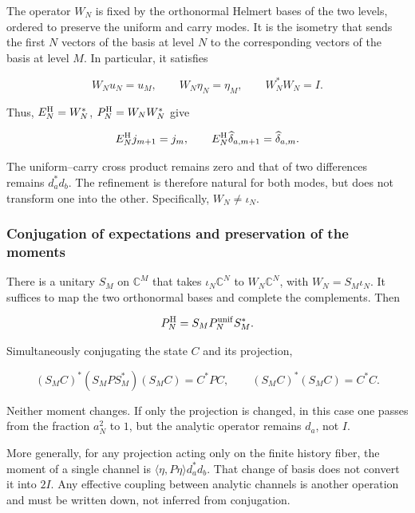 The operator \(W_N\) is fixed by the orthonormal Helmert bases
of the two levels, ordered to preserve the uniform and carry
modes. It is the isometry that sends the first \(N\) vectors of the
basis at level \(N\) to the corresponding vectors of the basis at level \(M\).
In particular, it satisfies

\begin{equation}
W_Nu_N=u_M,\qquad W_N\eta_N=\eta_M,\qquad W_N^*W_N=I.
\label{viii:gamma-add-display-12}
\end{equation}

Thus, \(E_N^{\rm H}=W_N^*\), \(P_N^{\rm H}=W_NW_N^*\) give

\begin{equation}
E_N^{\rm H}j_{m+1}=j_m,\qquad
E_N^{\rm H}\widehat\delta_{a,m+1}=\widehat\delta_{a,m}.
\label{viii:gamma-add-eq-5}
\end{equation}

The uniform--carry cross product remains zero and that of two differences remains \(d_a^*d_b\). The refinement is therefore natural for both modes, but does not transform one into the other. Specifically, \(W_N\ne\iota_N\).

\subsubsection{Conjugation of expectations and preservation of the moments}
\label{viii:gamma-add-sub-174}

There is a unitary \(S_M\) on \(\mathbb C^M\) that takes \(\iota_N\mathbb C^N\) to \(W_N\mathbb C^N\), with \(W_N=S_M\iota_N\). It suffices to map the two orthonormal bases and complete the complements. Then

\begin{equation}
P_N^{\rm H}=S_MP_N^{\rm unif}S_M^*.
\label{viii:gamma-add-display-14}
\end{equation}

Simultaneously conjugating the state \(C\) and its projection,

\begin{equation}
(S_MC)^*(S_MP S_M^*)(S_MC)=C^*PC,\qquad
(S_MC)^*(S_MC)=C^*C.
\label{viii:gamma-add-eq-6}
\end{equation}

Neither moment changes. If only the projection is changed, in this case one passes from the fraction \(a_N^2\) to \(1\), but the analytic operator remains \(d_a\), not \(I\).

More generally, for any projection acting only on the finite history fiber, the moment of a single channel is
\(\langle\eta,P\eta\rangle d_a^*d_b\). That change of basis does not convert it into \(2I\). Any effective coupling between analytic channels is another operation and must be written down, not inferred from conjugation.

